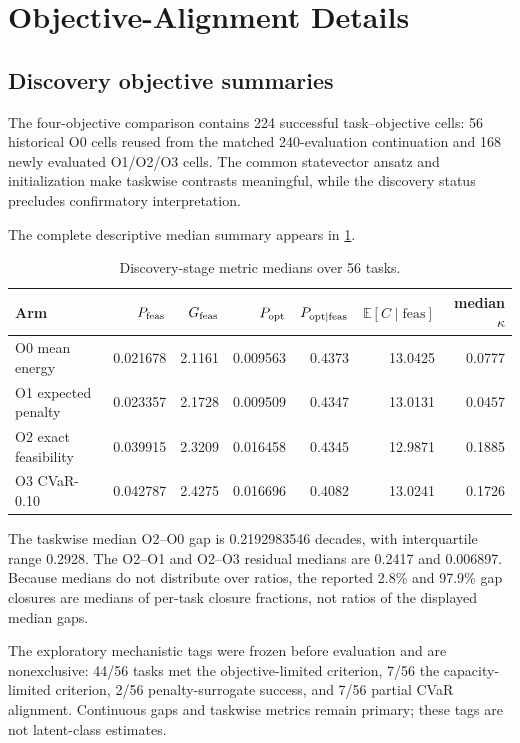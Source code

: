 \section{Objective-Alignment Details}
\label{app:objective-details}

\subsection{Discovery objective summaries}

The four-objective comparison contains 224 successful task--objective cells:
56 historical O0 cells reused from the matched 240-evaluation continuation and
168 newly evaluated O1/O2/O3 cells. The common statevector ansatz and
initialization make taskwise contrasts meaningful, while the discovery status
precludes confirmatory interpretation.

The complete descriptive median summary appears in
\cref{tab:discovery-medians}.
\begin{table}[ht]
\centering
\caption{Discovery-stage metric medians over 56 tasks.}
\label{tab:discovery-medians}
\small
\begin{tabular}{@{}lrrrrrr@{}}
\toprule
Arm & $P_{\mathrm{feas}}$ & $G_{\mathrm{feas}}$ & $P_{\mathrm{opt}}$ & $P_{\mathrm{opt}\mid\mathrm{feas}}$ & $\mathbb{E}[C\mid\mathrm{feas}]$ & median $\kappa$ \\
\midrule
O0 mean energy & 0.021678 & 2.1161 & 0.009563 & 0.4373 & 13.0425 & 0.0777 \\
O1 expected penalty & 0.023357 & 2.1728 & 0.009509 & 0.4347 & 13.0131 & 0.0457 \\
O2 exact feasibility & 0.039915 & 2.3209 & 0.016458 & 0.4345 & 12.9871 & 0.1885 \\
O3 CVaR-0.10 & 0.042787 & 2.4275 & 0.016696 & 0.4082 & 13.0241 & 0.1726 \\
\bottomrule
\end{tabular}
\end{table}

The taskwise median O2--O0 gap is 0.2192983546 decades, with interquartile
range 0.2928. The O2--O1 and O2--O3 residual medians are 0.2417 and 0.006897.
Because medians do not distribute over ratios, the reported 2.8\% and 97.9\%
gap closures are medians of per-task closure fractions, not ratios of the
displayed median gaps.

The exploratory mechanistic tags were frozen before evaluation and are
nonexclusive: 44/56 tasks met the objective-limited criterion, 7/56 the
capacity-limited criterion, 2/56 penalty-surrogate success, and 7/56 partial
CVaR alignment. Continuous gaps and taskwise metrics remain primary; these
tags are not latent-class estimates.


